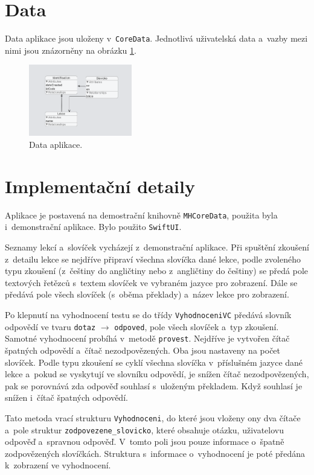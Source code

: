 \documentclass[10pt, a4paper]{article}
\begin{document}
\section{Data}

Data aplikace jsou uloženy v~\verb|CoreData|. Jednotlivá uživatelská data a~vazby mezi nimi jsou znázorněny na obrázku \ref{data}.

\begin{figure}[h]
\centering

\includegraphics[width=0.4\textwidth]{img/data.png} 
\caption{Data aplikace.}\label{data}
\end{figure}

\section{Implementační detaily}

Aplikace je postavená na demostrační knihovně \verb|MHCoreData|, použita byla i~demonstrační aplikace. Bylo použito \verb|SwiftUI|.

Seznamy lekcí a~slovíček vycházejí z~demonstrační aplikace. Při spuštění zkoušení z~detailu lekce se nejdříve připraví všechna slovíčka dané lekce, podle zvoleného typu zkoušení (z~češtiny do angličtiny nebo z~angličtiny do češtiny) se předá pole textových řetězců s~textem slovíček ve vybraném jazyce pro zobrazení. Dále se předává pole všech slovíček (s~oběma překlady) a~název lekce pro zobrazení.

Po klepnutí na vyhodnocení testu se do třídy \verb|VyhodnoceniVC| předává slovník odpovědí ve tvaru \verb|dotaz| $\rightarrow$ \verb|odpoved|, pole všech slovíček a~typ zkoušení. Samotné vyhodnocení probíhá v~metodě \verb|provest|. Nejdříve je vytvořen čítač špatných odpovědí a~čítač nezodpovězených. Oba jsou nastaveny na počet slovíček. Podle typu zkoušení se cyklí všechna slovíčka v~příslušném jazyce dané lekce a~pokud se vyskytují ve slovníku odpovědí, je snížen čítač nezodpovězených, pak se porovnává zda odpověď souhlasí s~uloženým překladem. Když souhlasí je snížen i~čítač špatných odpovědí.

Tato metoda vrací strukturu \verb|Vyhodnoceni|, do které jsou vloženy ony dva čítače a~pole struktur \verb|zodpovezene_slovicko|, které obsahuje otázku, uživatelovu odpověď a~spravnou odpověď. V~tomto poli jsou pouze informace o~špatně zodpovězených slovíčkách. Struktura s~informace o~vyhodnocení je poté předána k~zobrazení ve vyhodnocení.
\end{document}
